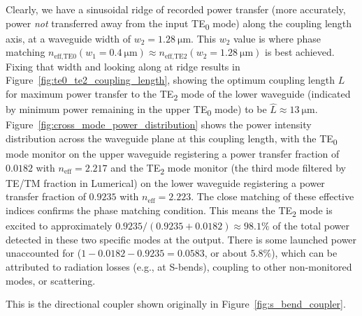 \documentclass[10pt, a4paper]{article}
\begin{document}
Clearly, we have a sinusoidal ridge of recorded power transfer (more accurately, power \textit{not} transferred away from the input TE\textsubscript{0} mode)
along the coupling length axis,
at a waveguide width of \(w_2=\SI{1.28}{\um}\). This \(w_2\) value is where phase matching \(n_{\text{eff,TE0}}(w_1=\SI{0.4}{\um}) \approx n_{\text{eff,TE2}}(w_2=\SI{1.28}{\um})\) is best achieved.
Fixing that width and looking along at ridge results in Figure~\ref{fig:te0_te2_coupling_length}, showing the optimum coupling length \(L\) for maximum power transfer to the TE\textsubscript{2} mode of the lower waveguide (indicated by minimum power remaining in the upper TE\textsubscript{0} mode)
to be \(\hat{L}\approx\SI{13}{\um}\). Figure~\ref{fig:cross_mode_power_distribution} shows the power intensity distribution across the waveguide plane at this coupling length,
with the TE\textsubscript{0} mode monitor on the upper waveguide registering a power transfer fraction of \(0.0182\) with \(n_\text{eff}=2.217\) and the TE\textsubscript{2} mode monitor (the third mode filtered by TE/TM fraction in Lumerical) on the lower waveguide registering a power transfer fraction of \(0.9235\) with \(n_\text{eff}=2.223\). The close matching of these effective indices confirms the phase matching condition. This means the TE\textsubscript{2} mode is excited to approximately \(0.9235 / (0.9235 + 0.0182) \approx 98.1\%\) of the total power detected in these two specific modes at the output. There is some launched power unaccounted for (\(1 - 0.0182 - 0.9235 = 0.0583\), or about \(5.8\%\)), which can be attributed to radiation losses (e.g., at S-bends), coupling to other non-monitored modes, or scattering.

This is the directional coupler shown originally in Figure~\ref{fig:s_bend_coupler}.
\end{document}
